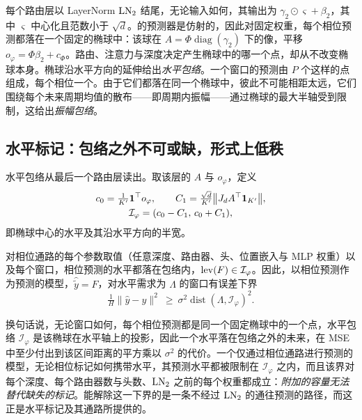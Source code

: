 {
每个路由层以 LayerNorm $\operatorname{LN}_2$ 结尾，无论输入如何，其输出为 $\gamma_2\odot\varsigma+\beta_2$，其中 $\varsigma$ 中心化且范数小于 $\sqrt d$。的预测器是仿射的，因此对固定权重，每个相位预测都落在一个固定的椭球中：该球在 $A=\Phi\operatorname{diag}(\gamma_2)$ 下的像，平移 $o_\varphi=\Phi\beta_2+c_\Phi$。路由、注意力与深度决定产生椭球中的哪一个点，却从不改变椭球本身。椭球沿水平方向的延伸给出\emph{水平包络}。一个窗口的预测由 $P$ 个这样的点组成，每个相位一个。由于它们都落在同一个椭球中，彼此不可能相距太远，它们围绕每个未来周期均值的散布——即周期内振幅——通过椭球的最大半轴受到限制，这给出\emph{振幅包络}。

\subsection{水平标记：包络之外不可或缺，形式上低秩}
\label{sec:theory_level}

水平包络从最后一个路由层读出。取该层的 $A$ 与 $o_\varphi$，定义
\begin{equation}
\begin{gathered}
c_0=\tfrac{1}{K'}\mathbf 1^\top o_\varphi,\qquad
C_1=\tfrac{\sqrt d}{K'}\big\|J_dA^\top\mathbf 1_{K'}\big\|,\\
\mathcal I_\varphi=(c_0-C_1,\,c_0+C_1),
\end{gathered}
\label{eq:envelope_constants}
\end{equation}
即椭球中心的水平及其沿水平方向的半宽。

\begin{theorem}[水平包络]
\label{thm:level_envelope}
对相位通路的每个参数取值（任意深度、路由器、头、位置嵌入与 MLP 权重）以及每个窗口，相位预测的水平都落在包络内，$\operatorname{lev}(F)\in\mathcal I_\varphi$。因此，以相位预测作为预测的模型，$\hat{\tilde y}=F$，对水平需求为 $\Lambda$ 的窗口有误差下界
\begin{equation}
\tfrac1H\|\hat y-y\|^2\ \ge\ \sigma^2\operatorname{dist}(\Lambda,\mathcal I_\varphi)^2 .
\label{eq:level_floor}
\end{equation}
\end{theorem}

换句话说，无论窗口如何，每个相位预测都是同一个固定椭球中的一个点，水平包络 $\mathcal I_\varphi$ 是该椭球在水平轴上的投影，因此一个水平落在包络之外的未来，在 MSE 中至少付出到该区间距离的平方乘以 $\sigma^2$ 的代价。一个仅通过相位通路进行预测的模型，无论相位标记如何携带水平，其预测水平都被限制在 $\mathcal I_\varphi$ 之内，而且该界对每个深度、每个路由器数与头数、$\operatorname{LN}_2$ 之前的每个权重都成立：\emph{附加的容量无法替代缺失的标记}。能解除这一下界的是一条不经过 $\operatorname{LN}_2$ 的通往预测的路径，而这正是水平标记及其通路所提供的。

}
